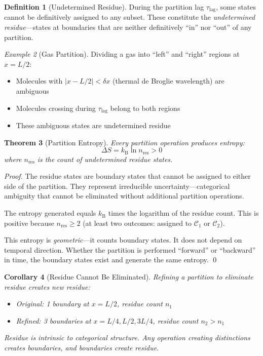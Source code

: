 \documentclass[twocolumn,10pt]{article}
\newtheorem{theorem}{Theorem}[section]
\newtheorem{corollary}[theorem]{Corollary}
\theoremstyle{definition}
\newtheorem{definition}[theorem]{Definition}
\theoremstyle{remark}
\newtheorem{example}[theorem]{Example}
\newcommand{\kB}{k_{\mathrm{B}}}
\begin{document}
\begin{definition}[Undetermined Residue]
During the partition lag $\tau_{\text{lag}}$, some states cannot be definitively assigned to any subset. These constitute the \textit{undetermined residue}---states at boundaries that are neither definitively ``in'' nor ``out'' of any partition.
\end{definition}

\begin{example}[Gas Partition]
Dividing a gas into ``left'' and ``right'' regions at $x = L/2$:
\begin{itemize}
\item Molecules with $|x - L/2| < \delta x$ (thermal de Broglie wavelength) are ambiguous
\item Molecules crossing during $\tau_{\text{lag}}$ belong to both regions
\item These ambiguous states are undetermined residue
\end{itemize}
\end{example}

\begin{theorem}[Partition Entropy]
\label{thm:partition_entropy}
Every partition operation produces entropy:
\begin{equation}
\Delta S = \kB \ln n_{\text{res}} > 0
\end{equation}
where $n_{\text{res}}$ is the count of undetermined residue states.
\end{theorem}

\begin{proof}
The residue states are boundary states that cannot be assigned to either side of the partition. They represent irreducible uncertainty---categorical ambiguity that cannot be eliminated without additional partition operations.

The entropy generated equals $\kB$ times the logarithm of the residue count. This is positive because $n_{\text{res}} \geq 2$ (at least two outcomes: assigned to $\mathcal{C}_1$ or $\mathcal{C}_2$).

This entropy is \textit{geometric}---it counts boundary states. It does not depend on temporal direction. Whether the partition is performed ``forward'' or ``backward'' in time, the boundary states exist and generate the same entropy. \qed
\end{proof}

\begin{corollary}[Residue Cannot Be Eliminated]
Refining a partition to eliminate residue creates new residue:
\begin{itemize}
\item Original: 1 boundary at $x = L/2$, residue count $n_1$
\item Refined: 3 boundaries at $x = L/4, L/2, 3L/4$, residue count $n_2 > n_1$
\end{itemize}
Residue is intrinsic to categorical structure. Any operation creating distinctions creates boundaries, and boundaries create residue.
\end{corollary}
\end{document}
